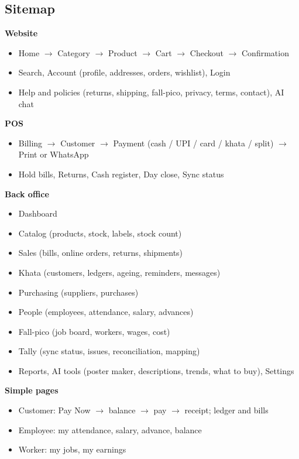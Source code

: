 \documentclass[11pt,a4paper]{article}
\begin{document}
\subsection{Sitemap}
\textbf{Website}
\begin{itemize}
\item Home $\rightarrow$ Category $\rightarrow$ Product $\rightarrow$ Cart $\rightarrow$ Checkout $\rightarrow$ Confirmation
\item Search, Account (profile, addresses, orders, wishlist), Login
\item Help and policies (returns, shipping, fall-pico, privacy, terms, contact), AI chat
\end{itemize}
\textbf{POS}
\begin{itemize}
\item Billing $\rightarrow$ Customer $\rightarrow$ Payment (cash / UPI / card / khata / split) $\rightarrow$ Print or WhatsApp
\item Hold bills, Returns, Cash register, Day close, Sync status
\end{itemize}
\textbf{Back office}
\begin{itemize}
\item Dashboard
\item Catalog (products, stock, labels, stock count)
\item Sales (bills, online orders, returns, shipments)
\item Khata (customers, ledgers, ageing, reminders, messages)
\item Purchasing (suppliers, purchases)
\item People (employees, attendance, salary, advances)
\item Fall-pico (job board, workers, wages, cost)
\item Tally (sync status, issues, reconciliation, mapping)
\item Reports, AI tools (poster maker, descriptions, trends, what to buy), Settings
\end{itemize}
\textbf{Simple pages}
\begin{itemize}
\item Customer: Pay Now $\rightarrow$ balance $\rightarrow$ pay $\rightarrow$ receipt; ledger and bills
\item Employee: my attendance, salary, advance, balance
\item Worker: my jobs, my earnings
\end{itemize}
\end{document}
